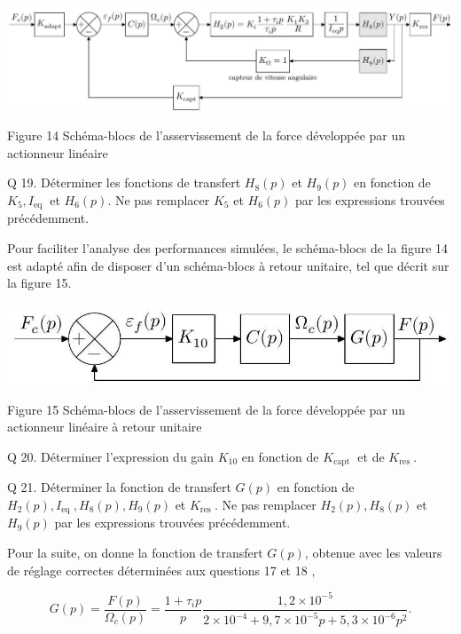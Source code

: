 \documentclass[10pt]{article}
\begin{document}
\begin{center}
\includegraphics[max width=\textwidth]{2024_03_20_0c3cf888f6e04b1986bcg-11(1)}
\end{center}

Figure 14 Schéma-blocs de l'asservissement de la force développée par un actionneur linéaire

Q 19. Déterminer les fonctions de transfert $H_{8}(p)$ et $H_{9}(p)$ en fonction de $K_{5}, I_{\text {eq }}$ et $H_{6}(p)$. Ne pas remplacer $K_{5}$ et $H_{6}(p)$ par les expressions trouvées précédemment.

Pour faciliter l'analyse des performances simulées, le schéma-blocs de la figure 14 est adapté afin de disposer d'un schéma-blocs à retour unitaire, tel que décrit sur la figure 15.

\begin{center}
\includegraphics[max width=\textwidth]{2024_03_20_0c3cf888f6e04b1986bcg-11}
\end{center}

Figure 15 Schéma-blocs de l'asservissement de la force développée par un actionneur linéaire à retour unitaire

Q 20. Déterminer l'expression du gain $K_{10}$ en fonction de $K_{\text {capt }}$ et de $K_{\text {res }}$.

Q 21. Déterminer la fonction de transfert $G(p)$ en fonction de $H_{2}(p), I_{\text {eq }}, H_{8}(p), H_{9}(p)$ et $K_{\text {res }}$. Ne pas remplacer $H_{2}(p), H_{8}(p)$ et $H_{9}(p)$ par les expressions trouvées précédemment.

Pour la suite, on donne la fonction de transfert $G(p)$, obtenue avec les valeurs de réglage correctes déterminées aux questions 17 et 18 ,

$$
G(p)=\frac{F(p)}{\Omega_{c}(p)}=\frac{1+\tau_{i} p}{p} \frac{1,2 \times 10^{-5}}{2 \times 10^{-4}+9,7 \times 10^{-5} p+5,3 \times 10^{-6} p^{2}} .
$$
\end{document}
